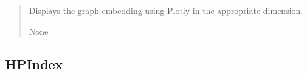 \documentclass[letterpaper,10pt,english]{sphinxmanual}
\begin{document}
\begin{fulllineitems}
\begin{fulllineitems}
\begin{quote}
\begin{description}
\begin{itemize}
\end{itemize}

\sphinxAtStartPar
Displays the graph embedding using Plotly in the appropriate dimension.

\sphinxAtStartPar
None

\end{description}\end{quote}

\end{fulllineitems}


\end{fulllineitems}



\subsection{HPIndex}
\label{\detokenize{api_reference:hpindex}}
\end{document}
